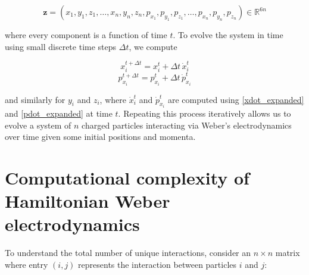 \documentclass[12pt,a4paper]{article}
\theoremstyle{definition}
\theoremstyle{remark}
\begin{document}
\begin{equation}\label{z}
    \mathbf{z} = (x_1, y_1, z_1, \ldots, x_n, y_n, z_n, p_{x_1}, p_{y_1}, p_{z_1}, \ldots, p_{x_n}, p_{y_n}, p_{z_n}) \in \mathbb{R}^{6n}
\end{equation}

where every component is a function of time $t$. To evolve the system in time using small discrete time steps $\Delta t$, we compute

\begin{equation}\label{update_step_x}
    x_i^{t + \Delta t} = x_i^t + \Delta t \, \dot{x}_i^t
\end{equation}
\begin{equation}\label{update_step_p}
    p_{x_i}^{t + \Delta t} = p_{x_i}^t + \Delta t \, \dot{p}_{x_i}^t
\end{equation}

and similarly for $y_i$ and $z_i$, where $\dot{x}_i^t$ and $\dot{p}_{x_i}^t$ are computed using \eqref{xdot_expanded} and \eqref{pdot_expanded} at time $t$. Repeating this process iteratively allows us to evolve a system of $n$ charged particles interacting via Weber's electrodynamics over time given some initial positions and momenta.

\section[Computational complexity of Hamiltonian Weber electrodynamics]{Computational complexity of Hamiltonian Weber \\ electrodynamics}\label{complexity}
To understand the total number of unique interactions, consider an $n \times n$ matrix where entry $(i,j)$ represents the interaction between particles $i$ and $j$:
\end{document}
